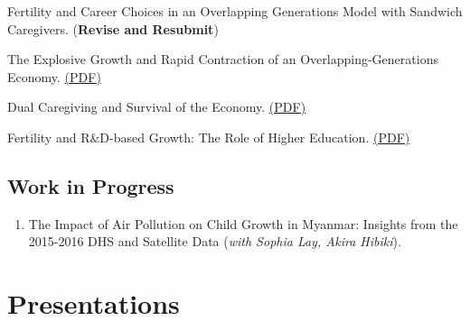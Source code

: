 \documentclass[12pt]{article}
\begin{document}
\begin{enumerate}[label={[\arabic*]}]

\item Fertility and Career Choices in an Overlapping Generations Model with Sandwich Caregivers. (\textbf{Revise and Resubmit})

\item The Explosive Growth and Rapid Contraction of an Overlapping-Generations Economy. \href{https://www.dropbox.com/scl/fi/a7b1vnmypehibjmd2wim4/main_rapidcontraction.pdf?rlkey=t3aoep2iiy7shjmpq9cp6tuz3&st=b5jwqdqg&dl=0}{(PDF)}

\item Dual Caregiving and Survival of the Economy. \href{https://www.dropbox.com/scl/fi/s00pcg0017vtyeb364hlc/main_dualcare-copy.pdf?rlkey=koecpcdaoeroijigjm5x4dtzv&st=6rnfdie5&dl=0}{(PDF)}

\item Fertility and R\&D-based Growth: The Role of Higher Education. \href{https://www.dropbox.com/scl/fi/6bkvc2vxrbst1iwocxwdl/main_overedu.pdf?rlkey=v59fcybxfcd105y2ciassjttn&st=ym5ntxq0&dl=0}{(PDF)}

\end{enumerate}

\subsection{Work in Progress}

\begin{enumerate}[resume*] 

\item The Impact of Air Pollution on Child Growth in Myanmar: Insights from the 2015-2016 DHS and Satellite Data (\textit{with Sophia Lay, Akira Hibiki}).

\end{enumerate}



\section{Presentations}
\end{document}
